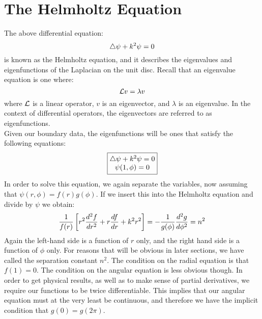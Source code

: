 \documentclass{paper}
\begin{document}
\section{The Helmholtz Equation}
The above differential equation:
\begin{equation}
  \bigtriangleup \psi+k^2\psi=0
\end{equation}
is known as the Helmholtz equation, and it describes the eigenvalues and eigenfunctions of the Laplacian on the unit disc. Recall that an eigenvalue equation is one where:
\begin{equation}
  \mathcal{L}v = \lambda v
\end{equation}
where $\mathcal{L}$ is a linear operator, $v$ is an eigenvector, and $\lambda$ is an eigenvalue. In the context of differential operators, the eigenvectors are referred to as eigenfunctions.\\
Given our boundary data, the eigenfunctions will be ones that satisfy the following equations:
\begin{equation}
  \boxed{
    \begin{matrix}
      \bigtriangleup \psi+k^2\psi=0 \\ 
      \psi(1,\phi) = 0
    \end{matrix}
  }
\end{equation}
In order to solve this equation, we again separate the variables, now assuming that $\psi(r,\phi)=f(r)g(\phi)$. If we insert this into the Helmholtz equation and divide by $\psi$ we obtain:
\begin{equation}
  \frac{1}{f(r)}\left[r^2 \frac{d ^2 f}{d r^2} + r \frac{d f}{d r}+k^2 r^2\right] = -\frac{1}{g(\phi)}\frac{d ^2 g}{d \phi^2} = n^2
\end{equation}
Again the left-hand side is a function of $r$ only, and the right hand side is a function of $\phi$ only. For reasons that will be obvious in later sections, we have called the separation constant $n^2$. The condition on the radial equation is that $f(1) = 0$. The condition on the angular equation is less obvious though. In order to get physical results, as well as to make sense of partial derivatives, we require our functions to be twice differentiable. This implies that our angular equation must at the very least be continuous, and therefore we have the implicit condition that $g(0)=g(2\pi)$.
\end{document}
